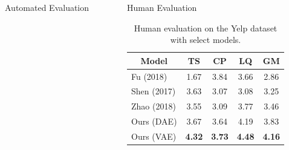 \documentclass[final]{beamer}
\newlength{\onecolwid}
\newlength{\twocolwid}
\newcommand{\tabc}[2]{\multicolumn{1}{c}{\multirow{#1}{*}{\textbf{#2}}}}
\begin{document}
\begin{frame}[t]
\begin{columns}[t]
\begin{column}{\twocolwid}
\begin{columns}[t,totalwidth=\twocolwid]
\begin{column}{\onecolwid}
\begin{block}{Automated Evaluation}
                    \end{block}


                \end{column} %

                \begin{column}{\onecolwid} %

                    \begin{block}{Human Evaluation}

                        \begin{table}[ht]
                            \centering
                            \begin{tabular}{ l c c c c }
                                \tabc{1}{Model} & \textbf{TS}       & \textbf{CP}       & \textbf{LQ}       & \textbf{GM}       \\
                                \hline
                                Fu (2018)       & \color{gray} 1.67 & \color{gray} 3.84 & \color{gray} 3.66 & \color{gray} 2.86 \\
                                Shen (2017)     & 3.63              & 3.07              & 3.08              & 3.25              \\
                                Zhao (2018)     & 3.55              & 3.09              & 3.77              & 3.46              \\
                                Ours (DAE)      & 3.67              & 3.64              & 4.19              & 3.83              \\
                                Ours (VAE)      & \textbf{4.32}     & \textbf{3.73}     & \textbf{4.48}     & \textbf{4.16}     \\
                            \end{tabular}
                            \caption{Human evaluation on the Yelp dataset with select models.}
                            \label{tab:human-evaluation}
                        \end{table}
                    \end{block}

                    \vspace{-1.6cm}


\end{column}
\end{columns}
\end{column}
\end{columns}
\end{frame}
\end{document}
